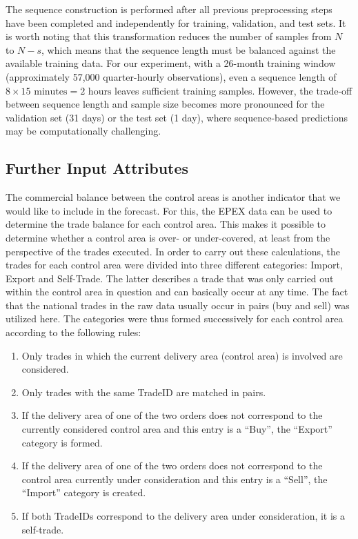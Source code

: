 \documentclass[preprint,12pt,nonatbib]{elsarticle}
\begin{document}
The sequence construction is performed after all previous preprocessing steps have been completed and independently for training, validation, and test sets.
It is worth noting that this transformation reduces the number of samples from \(N\) to \(N - s\), which means that the sequence length must be balanced against the available training data.
For our experiment, with a 26-month training window (approximately 57,000 quarter-hourly observations), even a sequence length of \(8 \times 15\text{ minutes} = 2\text{ hours}\) leaves sufficient training samples.
However, the trade-off between sequence length and sample size becomes more pronounced for the validation set (31 days) or the test set (1 day), where sequence-based predictions may be computationally challenging.

\subsection{Further Input Attributes}
The commercial balance between the control areas is another indicator that we would like to include in the forecast.
For this, the EPEX data can be used to determine the trade balance for each control area.
This makes it possible to determine whether a control area is over- or under-covered, at least from the perspective of the trades executed.
In order to carry out these calculations, the trades for each control area were divided into three different categories: Import, Export and Self-Trade.
The latter describes a trade that was only carried out within the control area in question and can basically occur at any time.
The fact that the national trades in the raw data usually occur in pairs (buy and sell) was utilized here.
The categories were thus formed successively for each control area according to the following rules:
\begin{enumerate}[noitemsep]
    \item Only trades in which the current delivery area (control area) is involved are considered.
    \item Only trades with the same TradeID are matched in pairs.
    \item If the delivery area of one of the two orders does not correspond to the currently considered control area and this entry is a ``Buy'', the ``Export'' category is formed.
    \item If the delivery area of one of the two orders does not correspond to the control area currently under consideration and this entry is a ``Sell'', the ``Import'' category is created.
    \item If both TradeIDs correspond to the delivery area under consideration, it is a self-trade.
\end{enumerate}
\end{document}
